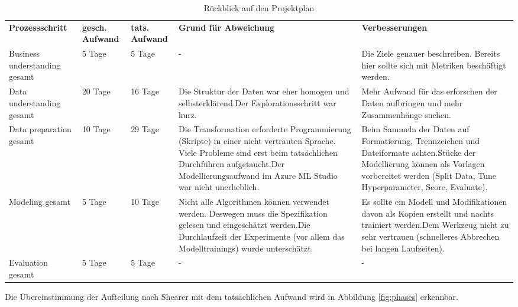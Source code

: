 \begin{table}[H]
\centering
\begin{tabular}{|p{3cm}|p{}|p{}|p{}|p{}|}
\hline
\textbf{Prozessschritt} & \textbf{gesch. Aufwand} & \textbf{tats. Aufwand} & \textbf{Grund für Abweichung} & \textbf{Verbesserungen} \\ 
\hhline{=====}
Business understanding gesamt & 5 Tage & 5 Tage & - & Die Ziele genauer beschreiben. Bereits hier sollte sich mit Metriken beschäftigt werden. \\ \hline
Data understanding gesamt & 20 Tage & 16 Tage & Die Struktur der Daten war eher homogen und selbsterklärend.\newline Der Explorationsschritt war kurz. & Mehr Aufwand für das erforschen der Daten aufbringen und mehr Zusammenhänge suchen. \\ \hline
Data preparation gesamt & 10 Tage & 29 Tage & Die Transformation erforderte Programmierung (Skripte) in einer nicht vertrauten Sprache. Viele Probleme sind erst beim tatsächlichen Durchführen aufgetaucht.\newline Der Modellierungsaufwand im Azure ML Studio war nicht unerheblich. & Beim Sammeln der Daten auf Formatierung, Trennzeichen und Dateiformate achten.\newline Stücke der Modellierung können als Vorlagen vorbereitet werden (Split Data, Tune Hyperparameter, Score, Evaluate). \\ \hline
Modeling gesamt & 5 Tage & 10 Tage & Nicht alle Algorithmen können verwendet werden. Deswegen muss die Spezifikation gelesen und eingeschätzt werden.\newline Die Durchlaufzeit der Experimente (vor allem das Modelltrainings) wurde unterschätzt. & Es sollte ein Modell und Modifikationen davon als Kopien erstellt und nachts trainiert werden.\newline Dem Werkzeug nicht zu sehr vertrauen (schnelleres Abbrechen bei langen Laufzeiten). \\ \hline
Evaluation gesamt & 5 Tage & 5 Tage & - & - \\ \hline
\end{tabular}
\caption{Rückblick auf den Projektplan}
\label{tab:ProcessReview}
\end{table}

Die Übereinstimmung der Aufteilung nach Shearer mit dem tatsächlichen Aufwand wird in Abbildung \ref{fig:phases} erkennbar.
 
